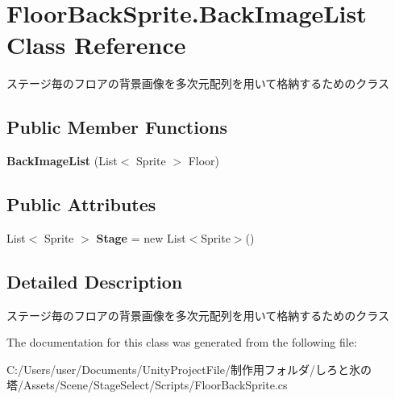 \hypertarget{class_floor_back_sprite_1_1_back_image_list}{}\section{Floor\+Back\+Sprite.\+Back\+Image\+List Class Reference}
\label{class_floor_back_sprite_1_1_back_image_list}


ステージ毎のフロアの背景画像を多次元配列を用いて格納するためのクラス  


\subsection*{Public Member Functions}
\begin{DoxyCompactItemize}
\item 
\mbox{\label{class_floor_back_sprite_1_1_back_image_list_a3b5f8176c4d2c6c30c5c082f7e761591}} 
{\bfseries Back\+Image\+List} (List$<$ Sprite $>$ Floor)
\end{DoxyCompactItemize}
\subsection*{Public Attributes}
\begin{DoxyCompactItemize}
\item 
\mbox{\label{class_floor_back_sprite_1_1_back_image_list_a512851298c895c60595487d6764e934a}} 
List$<$ Sprite $>$ {\bfseries Stage} = new List$<$Sprite$>$()
\end{DoxyCompactItemize}


\subsection{Detailed Description}
ステージ毎のフロアの背景画像を多次元配列を用いて格納するためのクラス 



The documentation for this class was generated from the following file\+:\begin{DoxyCompactItemize}
\item 
C\+:/\+Users/user/\+Documents/\+Unity\+Project\+File/制作用フォルダ/しろと氷の塔/\+Assets/\+Scene/\+Stage\+Select/\+Scripts/Floor\+Back\+Sprite.\+cs\end{DoxyCompactItemize}

